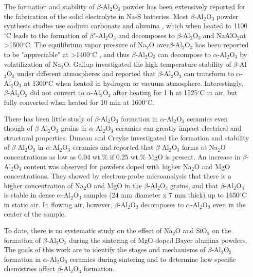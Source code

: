 The formation and stability of $\beta$-Al$_{2}$O$_{3}$ powder has been extensively reported for the fabrication of the solid electrolyte in Na-S batteries. Most $\beta$-Al$_{2}$O$_{3}$ powder synthesis studies use sodium carbonate and alumina \cite{Vries1969,Kummer1972a,Ray1975}, which when heated to 1100$^{\circ}$C leads to the formation of $\beta$"-Al$_{2}$O$_{3}$ and decomposes to $\beta$-Al$_{2}$O$_{3}$ and NaAlO$_{2 }$at >1500$^{\circ}$C. The equilibrium vapor pressure of Na$_{2}$O over$\beta$-Al$_{2}$O$_{3}$ has been reported to be "appreciable" at >1400$^{\circ}$C \cite{Kummer1972a}, and thus $\beta$-Al$_{2}$O$_{3}$ can decompose to $\alpha$-Al$_{2}$O$_{3}$ by volatilization of Na$_{2}$O. Gallup \cite{Gallup1935} investigated the high temperature stability of $\beta$-Al$_{2}$O$_{3}$ under different atmospheres and reported that $\beta$-Al$_{2}$O$_{3}$ can transform to $\alpha$-Al$_{2}$O$_{3}$ at 1300$^{\circ}$C when heated in hydrogen or vacuum atmosphere. Interestingly, $\beta$-Al$_{2}$O$_{3}$ did not convert to $\alpha$-Al$_{2}$O$_{3}$ after heating for 1 h at 1525$^{\circ}$C in air, but fully converted when heated for 10 min at 1600$^{\circ}$C. 

There has been little study of $\beta$-Al$_{2}$O$_{3}$ formation in $\alpha$-Al$_{2}$O$_{3}$ ceramics even though of $\beta$-Al$_{2}$O$_{3}$ grains in $\alpha$-Al$_{2}$O$_{3}$ ceramics can greatly impact electrical and structural properties. Duncan and Creyke \cite{Duncan1969a} investigated the formation and stability of $\beta$-Al$_{2}$O$_{3}$ in $\alpha$-Al$_{2}$O$_{3}$ ceramics and reported that $\beta$-Al$_{2}$O$_{3}$ forms at Na$_{2}$O concentrations as low as 0.04 wt.\% if 0.25 wt.\% MgO is present. An increase in $\beta$-Al$_{2}$O$_{3}$ content was observed for powders doped with higher Na$_{2}$O and MgO concentrations. They showed by electron-probe microanalysis that there is a higher concentration of Na$_{2}$O and MgO in the $\beta$-Al$_{2}$O$_{3}$ grains, and that $\beta$-Al$_{2}$O$_{3}$ is stable in dense $\alpha$-Al$_{2}$O$_{3}$ samples (24 mm diameter x 7 mm thick) up to 1650$^{\circ}$C in static air. In flowing air, however, $\beta$-Al$_{2}$O$_{3}$ decomposes to $\alpha$-Al$_{2}$O$_{3}$ even in the center of the sample.

To date, there is no systematic study on the effect of Na$_{2}$O and SiO$_{2}$ on the formation of $\beta$-Al$_{2}$O$_{3}$ during the sintering of MgO-doped Bayer alumina powders. The goals of this work are to identify the stages and mechanisms of $\beta$-Al$_{2}$O$_{3}$ formation in $\alpha$-Al$_{2}$O$_{3}$ ceramics during sintering and to determine how specific chemistries affect $\beta$-Al$_{2}$O$_{3}$ formation.

